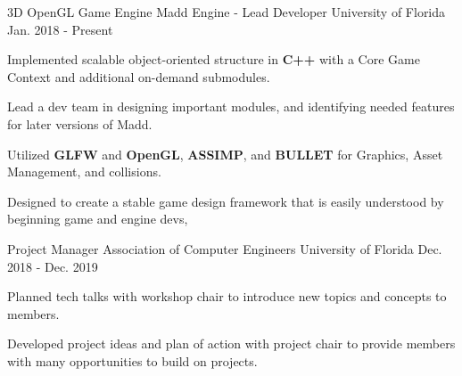 


\begin{cventries}


\cventry
{3D OpenGL Game Engine} %
{Madd Engine - Lead Developer} %
{University of Florida} %
{Jan. 2018 - Present} %
{ %
	\begin{cvitems}
		\setlength{\itemindent}{.125in}
		\item {Implemented scalable object-oriented structure in \textbf{C++} with a Core Game Context and additional on-demand submodules.}
		\item {Lead a dev team in designing important modules, and identifying needed features for later versions of Madd.}
		\item {Utilized \textbf{GLFW} and \textbf{OpenGL}, \textbf{ASSIMP}, and \textbf{BULLET} for Graphics, Asset Management, and collisions.}
		\item {Designed to create a stable game design framework that is easily understood by beginning game and engine devs,}
	\end{cvitems}
}


\cventry
{Project Manager} %
{Association of Computer Engineers} %
{University of Florida} %
{Dec. 2018 - Dec. 2019} %
{ %
	\begin{cvitems}
		\setlength{\itemindent}{.125in}
		\item {Planned tech talks with workshop chair to introduce new topics and concepts to members.}
		\item {Developed project ideas and plan of action with project chair to provide members with many opportunities to build on projects.}
	\end{cvitems}
}


\end{cventries}
